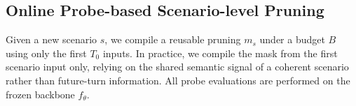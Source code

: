 \begin{table}[t]
\centering
\caption{\textbf{Pruning Time \& Speedup} on RTX A6000. Speedup is reported as light/aggressive. The complete results are in Table~\ref{tab:pruning_time}.}
\vspace{-2mm}
\footnotesize
\setlength{\tabcolsep}{2.2pt}   %
\renewcommand{\arraystretch}{1.05}
\vspace{-1mm}
\label{tab:pruning_time_main}
\end{table}
  
\subsection{Online Probe-based Scenario-level Pruning}
\label{sec:method_online}
\vspace{-1mm}

Given a new scenario $s$, we compile a reusable pruning $m_s$ under a budget $B$ using only the
first $T_0$ inputs.
In practice, we compile the mask from the first scenario input only, relying on the shared semantic signal of a coherent scenario rather than future-turn information.
All probe evaluations are performed on the frozen backbone $f_{\theta}$.

